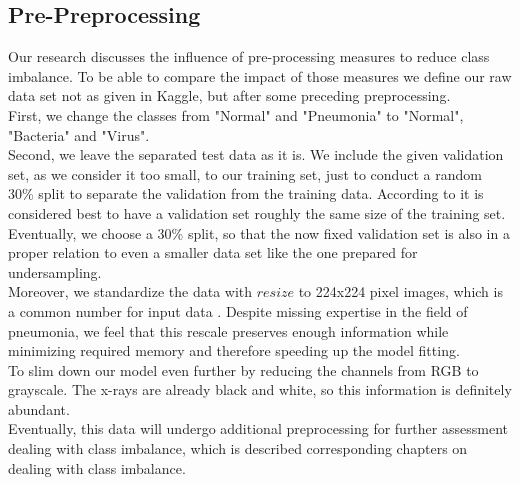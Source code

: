 \subsection{Pre-Preprocessing}
Our research discusses the influence of pre-processing measures to reduce class imbalance. To be able to compare the impact of those measures we define our raw data set not as given in Kaggle, but after some preceding preprocessing.\\
First, we change the classes from "Normal" and "Pneumonia" to "Normal", "Bacteria" and "Virus". \\
Second, we leave the separated test data as it is. We include the given validation set, as we consider it too small, to our training set, just to conduct a random 30\% split to separate the validation from the training data. According to \cite{bloem2020deeplearning1} it is considered best to have a validation set roughly the same size of the training set. Eventually, we choose a 30\% split, so that the now fixed validation set is also in a proper relation to even a smaller data set like the one prepared for undersampling.\\
Moreover, we standardize the data with $resize$ to 224x224 pixel images, which is a common number for input data \cite{karpathy2016convolutional}. Despite missing expertise in the field of pneumonia, we feel that this rescale preserves enough information while minimizing required memory and therefore speeding up the model fitting.\\
To slim down our model even further by reducing the channels from RGB to grayscale. The x-rays are already black and white, so this information is definitely abundant.\\
Eventually, this data will undergo additional preprocessing for further assessment dealing with class imbalance, which is described corresponding chapters on dealing with class imbalance.\\

